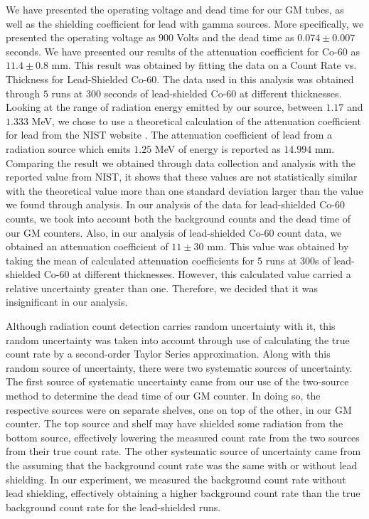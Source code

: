 \par We have presented the operating voltage and dead time for our GM tubes, as well as the shielding coefficient for lead with gamma sources. More specifically, we presented the operating voltage as $900$ Volts and the dead time as $0.074 \pm 0.007$ seconds. We have presented our results of the attenuation coefficient for Co-60 as $11.4 \pm 0.8$ mm. This result was obtained by fitting the data on a Count Rate vs. Thickness for Lead-Shielded Co-60. The data used in this analysis was obtained through $5$ runs at $300$ seconds of lead-shielded Co-60 at different thicknesses. Looking at the range of radiation energy emitted by our source, between $1.17$ and $1.333$ MeV, we chose to use a theoretical calculation of the attenuation coefficient for lead from the NIST website \cite{Shielding}. The attenuation coefficient of lead from a radiation source which emits $1.25$ MeV of energy is reported as $14.994$ mm. Comparing the result we obtained through data collection and analysis with the reported value from NIST, it shows that these values are not statistically similar with the theoretical value more than one standard deviation larger than the value we found through analysis. In our analysis of the data for lead-shielded Co-60 counts, we took into account both the background counts and the dead time of our GM counters. Also, in our analysis of lead-shielded Co-60 count data, we obtained an attenuation coefficient of $11 \pm 30$ mm. This value was obtained by taking the mean of calculated attenuation coefficients for $5$ runs at $300$s of lead-shielded Co-60 at different thicknesses. However, this calculated value carried a relative uncertainty greater than one. Therefore, we decided that it was insignificant in our analysis.
\par Although radiation count detection carries random uncertainty with it, this random uncertainty was taken into account through use of calculating the true count rate by a second-order Taylor Series approximation. Along with this random source of uncertainty, there were two systematic sources of uncertainty. The first source of systematic uncertainty came from our use of the two-source method to determine the dead time of our GM counter. In doing so, the respective sources were on separate shelves, one on top of the other, in our GM counter. The top source and shelf may have shielded some radiation from the bottom source, effectively lowering the measured count rate from the two sources from their true count rate. The other systematic source of uncertainty came from the assuming that the background count rate was the same with or without lead shielding. In our experiment, we measured the background count rate without lead shielding, effectively obtaining a higher background count rate than the true background count rate for the lead-shielded runs. 